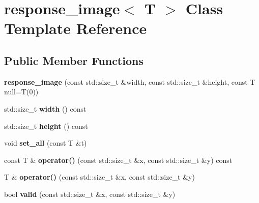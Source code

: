 \hypertarget{classresponse__image}{}\section{response\+\_\+image$<$ T $>$ Class Template Reference}
\label{classresponse__image}
\subsection*{Public Member Functions}
\begin{DoxyCompactItemize}
\item 
\mbox{\label{classresponse__image_af2a0692c471f27db7eaee84d5ecd0a4b}} 
{\bfseries response\+\_\+image} (const std\+::size\+\_\+t \&width, const std\+::size\+\_\+t \&height, const T null=T(0))
\item 
\mbox{\label{classresponse__image_a382174169c7efb3865b3e770ffccd795}} 
std\+::size\+\_\+t {\bfseries width} () const
\item 
\mbox{\label{classresponse__image_af4a3391978f096811ec04e1b0721545b}} 
std\+::size\+\_\+t {\bfseries height} () const
\item 
\mbox{\label{classresponse__image_ac9b95dda3d72c0fe2f27ad33162fbcce}} 
void {\bfseries set\+\_\+all} (const T \&t)
\item 
\mbox{\label{classresponse__image_aecc8a98ae8a30ac5d8c528ff46652941}} 
const T \& {\bfseries operator()} (const std\+::size\+\_\+t \&x, const std\+::size\+\_\+t \&y) const
\item 
\mbox{\label{classresponse__image_acfcf70d5538c6a953e5d729c2c179f1e}} 
T \& {\bfseries operator()} (const std\+::size\+\_\+t \&x, const std\+::size\+\_\+t \&y)
\item 
\mbox{\label{classresponse__image_ada082fb70720cfeabe1a823e78306999}} 
bool {\bfseries valid} (const std\+::size\+\_\+t \&x, const std\+::size\+\_\+t \&y)
\item 
\mbox{\label{classresponse__image_a3c6513575c90bd499d1f69885905c6b0}} 

\end{DoxyCompactItemize}
